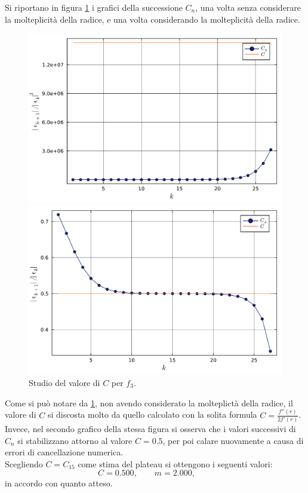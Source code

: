 \documentclass[letterpaper, 12pt]{article}
\begin{document}
Si riportano in figura \ref{fig:es3_3_2_6} i grafici della successione $C_n$, una volta senza considerare 
la molteplicità della radice, e una volta considerando la molteplicità della radice.
\begin{figure}[!ht]
    \centering
    \begin{minipage}[b]{0.47\textwidth}
        \includegraphics[width=\textwidth]{3323_C1.pdf}
    \end{minipage}
    \hspace{0.5cm}
    \begin{minipage}[b]{0.47\textwidth}
        \includegraphics[width=\textwidth]{3323_C2.pdf}
    \end{minipage}
    \caption{Studio del valore di $C$ per $f_3$.}
    \label{fig:es3_3_2_6}
\end{figure}

Come si può notare da \ref{fig:es3_3_2_6}, non avendo considerato la molteplictà della radice, il valore di $C$
si discosta molto da quello calcolato con la solita formula $C = \frac{ f''(r)}{2 f'(r)}$. Invece, nel secondo 
grafico della stessa figura si osserva che i valori successivi di $C_n$ si stabilizzano attorno al valore 
$C = 0.5$, per poi calare nuovamente a causa di errori di cancellazione numerica. \\
Scegliendo $C = C_{15}$ come stima del plateau si ottengono i seguenti valori:
\begin{equation}
    C = 0.500,
    \qquad
    m = 2.000,
    \qquad
\end{equation}
in accordo con quanto atteso. 
\end{document}
